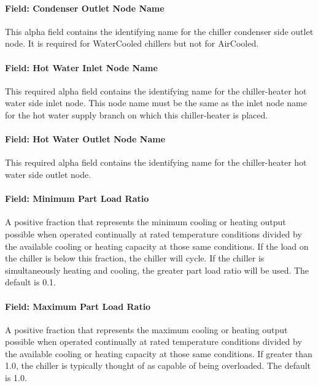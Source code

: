 \paragraph{Field: Condenser Outlet Node Name}\label{field-condenser-outlet-node-name-8}

This alpha field contains the identifying name for the chiller condenser side outlet node. It is required for WaterCooled chillers but not for AirCooled.

\paragraph{Field: Hot Water Inlet Node Name}\label{field-hot-water-inlet-node-name-1}

This required alpha field contains the identifying name for the chiller-heater hot water side inlet node. This node name must be the same as the inlet node name for the hot water supply branch on which this chiller-heater is placed.

\paragraph{Field: Hot Water Outlet Node Name}\label{field-hot-water-outlet-node-name-1}

This required alpha field contains the identifying name for the chiller-heater hot water side outlet node.

\paragraph{Field: Minimum Part Load Ratio}\label{field-minimum-part-load-ratio-8}

A positive fraction that represents the minimum cooling or heating output possible when operated continually at rated temperature conditions divided by the available cooling or heating capacity at those same conditions. If the load on the chiller is below this fraction, the chiller will cycle. If the chiller is simultaneously heating and cooling, the greater part load ratio will be used. The default is 0.1.

\paragraph{Field: Maximum Part Load Ratio}\label{field-maximum-part-load-ratio-8}

A positive fraction that represents the maximum cooling or heating output possible when operated continually at rated temperature conditions divided by the available cooling or heating capacity at those same conditions. If greater than 1.0, the chiller is typically thought of as capable of being overloaded. The default is 1.0.

